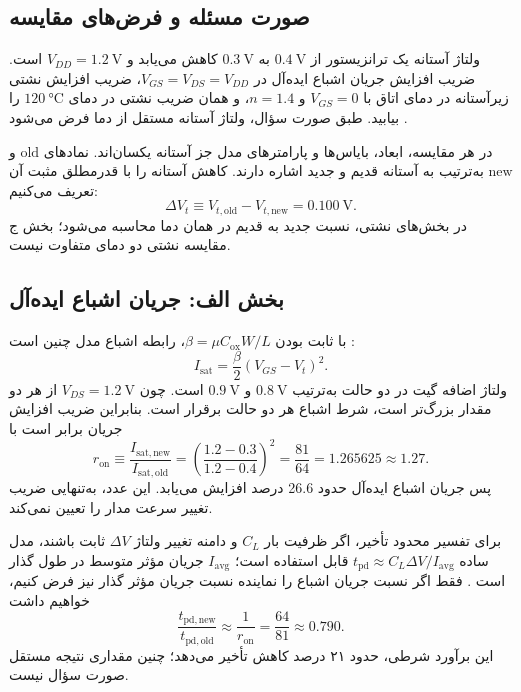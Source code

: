 \subsection*{صورت مسئله و فرض‌های مقایسه}
ولتاژ آستانه یک ترانزیستور  از \(\qty{0.4}{\volt}\) به \(\qty{0.3}{\volt}\) کاهش می‌یابد و
\(V_{DD}=\qty{1.2}{\volt}\) است.
ضریب افزایش جریان اشباع ایده‌آل در \(V_{GS}=V_{DS}=V_{DD}\)،
ضریب افزایش نشتی زیرآستانه در دمای اتاق با \(V_{GS}=0\) و \(n=1.4\)،
و همان ضریب نشتی در دمای \(\qty{120}{\degreeCelsius}\) را بیابید.
طبق صورت سؤال، ولتاژ آستانه مستقل از دما فرض می‌شود
\cite[تمرین ، صفحه چاپی ۹۶]{weste}.

در هر مقایسه، ابعاد، بایاس‌ها و پارامترهای مدل جز آستانه یکسان‌اند.
نمادهای \(\mathrm{old}\) و \(\mathrm{new}\) به‌ترتیب به آستانه قدیم و جدید اشاره دارند.
کاهش آستانه را با قدرمطلق مثبت آن تعریف می‌کنیم:
\begin{equation}
 \Delta V_t\equiv V_{t,\mathrm{old}}-V_{t,\mathrm{new}}=\qty{0.100}{\volt}.
 \label{eq:comparison-threshold-reduction}
\end{equation}
در بخش‌های نشتی، نسبت جدید به قدیم در همان دما محاسبه می‌شود؛ بخش ج مقایسه نشتی دو دمای متفاوت نیست.

\subsection*{بخش الف: جریان اشباع ایده‌آل}
با ثابت بودن \(\beta=\mu C_{\mathrm{ox}}W/L\)، رابطه اشباع مدل  چنین است
\cite[رابطه ، صفحه چاپی ۶۶]{weste}:
\begin{equation}
 I_{\mathrm{sat}}=\frac{\beta}{2}(V_{GS}-V_t)^2.
 \label{eq:comparison-saturation-model}
\end{equation}
ولتاژ اضافه گیت در دو حالت به‌ترتیب \(\qty{0.8}{\volt}\) و \(\qty{0.9}{\volt}\) است.
چون \(V_{DS}=\qty{1.2}{\volt}\) از هر دو مقدار بزرگ‌تر است، شرط اشباع هر دو حالت برقرار است.
بنابراین ضریب افزایش جریان برابر است با
\begin{equation}
 r_{\mathrm{on}}\equiv\frac{I_{\mathrm{sat,new}}}{I_{\mathrm{sat,old}}}
 =\left(\frac{1.2-0.3}{1.2-0.4}\right)^2
 =\frac{81}{64}=1.265625\approx\boxed{1.27}.
 \label{eq:comparison-on-ratio}
\end{equation}
پس جریان اشباع ایده‌آل حدود \num{26.6} درصد افزایش می‌یابد.
این عدد، به‌تنهایی ضریب تغییر سرعت مدار را تعیین نمی‌کند.

برای تفسیر محدود تأخیر، اگر ظرفیت بار \(C_L\) و دامنه تغییر ولتاژ \(\Delta V\) ثابت باشند،
مدل ساده \(t_{\mathrm{pd}}\approx C_L\Delta V/I_{\mathrm{avg}}\) قابل استفاده است؛
\(I_{\mathrm{avg}}\) جریان مؤثر متوسط در طول گذار است
\cite[اسلاید ۸]{mosfet}.
فقط اگر نسبت جریان اشباع را نماینده نسبت جریان مؤثر گذار نیز فرض کنیم، خواهیم داشت
\begin{equation}
 \frac{t_{\mathrm{pd,new}}}{t_{\mathrm{pd,old}}}
 \approx\frac{1}{r_{\mathrm{on}}}=\frac{64}{81}\approx0.790.
 \label{eq:comparison-delay-conditional}
\end{equation}
این برآورد شرطی، حدود ۲۱ درصد کاهش تأخیر می‌دهد؛ چنین مقداری نتیجه مستقل صورت سؤال نیست.

